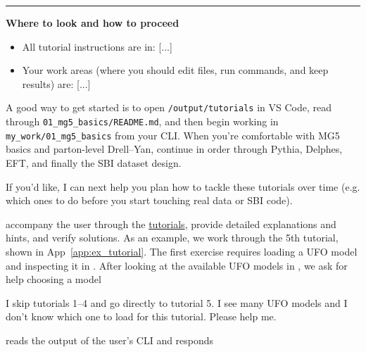 \documentclass[submission, Phys]{SciPost}
\begin{document}
\begin{promptblock}[\ma (shortened)]
\begin{itemize}
\end{itemize}

\vspace{1em}
\hrule
\vspace{1em}

\textbf{Where to look and how to proceed}
\begin{itemize}
\item All tutorial instructions are in: [...]
\item Your work areas (where you should edit files, run commands, and keep results) are: [...]
\end{itemize}

A good way to get started is to open \lstinline|/output/tutorials| in VS Code, read through \lstinline|01_mg5_basics/README.md|, and then begin working in \lstinline|my_work/01_mg5_basics| from your CLI. When you’re comfortable with MG5 basics and parton-level Drell–Yan, continue in order through Pythia, Delphes, EFT, and finally the SBI dataset design.

If you’d like, I can next help you plan how to tackle these tutorials over time (e.g. which ones to do before you start touching real data or SBI code).
\end{promptblock}
%
\ma accompany the user through the \href{https://github.com/heidelberg-hepml/MadAgents/tree/main/supplementary/tutorials}{tutorials}, provide detailed explanations and hints, and verify solutions. As an example, we work through the 5th tutorial, shown in App~\ref{app:ex_tutorial}. The first exercise requires loading a UFO model and inspecting it in \mg. After looking at the available UFO models in \mg, we ask \ma for help choosing a model
%
\begin{userblock}[User]
I skip tutorials 1–4 and go directly to tutorial 5. I see many UFO models and I don’t know which one to load for this tutorial. Please help me.
\end{userblock}
%
\ma reads the output of the user's CLI and responds
%
\end{document}
